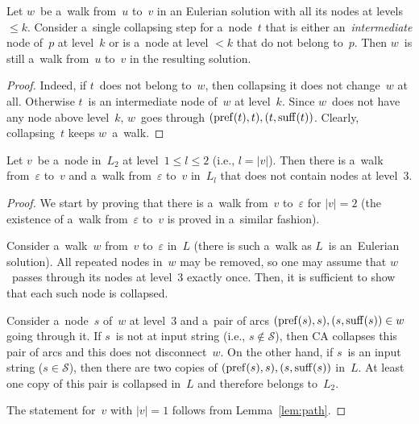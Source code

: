 \begin{lemma}\label{lem:path}
Let $w$~be a~walk from~$u$ to~$v$ in an Eulerian solution with all its nodes at levels~$\le k$. Consider a~single collapsing step for a~node~$t$ that is either an~{\em intermediate} node of~$p$ at level~$k$ or is a~node at level $<k$ that do not belong to~$p$. Then $w$~is still a~walk from~$u$ to~$v$ in the resulting solution. 
\end{lemma}
\begin{proof}
Indeed, if $t$~does not belong to~$w$, then collapsing it does not change~$w$ at all. Otherwise $t$~is an intermediate node of~$w$ at level~$k$. Since $w$~does not have any node above level~$k$, $w$~goes through
$(\operatorname{pref}(t), t), (t, \operatorname{suff}(t))$. Clearly, collapsing~$t$ keeps $w$~a~walk.
\end{proof}

\begin{lemma}\label{lemma:toepsilon}
Let $v$~be a~node in~$L_2$ at level~$1 \le l \le 2$ (i.e., $l=|v|$). Then there is a~walk from~$\varepsilon$ to~$v$ and a~walk from~$\varepsilon$ to~$v$ in~$L_l$ that does not contain nodes at level~3.
\end{lemma}
\begin{proof}
We start by proving that there is a~walk from~$v$ to~$\varepsilon$ 
for $|v|=2$ (the existence of a~walk from~$\varepsilon$ to~$v$ is proved in a~similar fashion).

Consider a~walk~$w$ from~$v$ to~$\varepsilon$ in~$L$ (there is such a~walk as $L$~is an~Eulerian solution). All repeated nodes in~$w$ may be removed, 
so one may assume that $w$~passes through its nodes at level~3 exactly once. Then, it is sufficient to show that each such node is collapsed.

Consider a~node~$s$ of~$w$ at level~3 and a~pair of arcs  $(\operatorname{pref}(s), s), (s, \operatorname{suff}(s)) \in w$ going through it. If $s$~is not at input string (i.e., $s \not \in \mathcal{S}$), then CA collapses this pair of arcs and this does not disconnect~$w$. On the other hand, if $s$~is an input string ($s \in \mathcal{S}$), then there are two copies of $(\operatorname{pref}(s), s), (s, \operatorname{suff}(s))$ in~$L$. At least one copy of this pair is collapsed in~$L$ and therefore belongs to~$L_2$.

The statement for~$v$ with $|v|=1$ follows from Lemma~\ref{lem:path}.
\end{proof}

